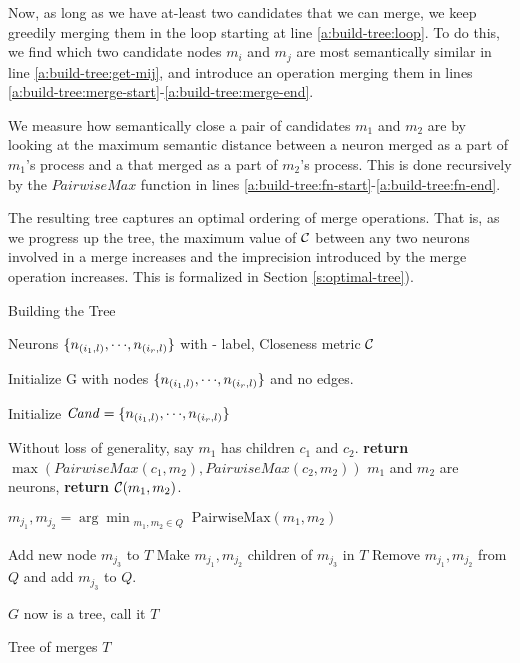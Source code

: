 Now, as long as we have at-least two candidates that we can merge, we keep
greedily merging them in the loop starting at line \ref{a:build-tree:loop}. To
do this, we find which two candidate nodes $m_i$ and $m_j$ are most semantically
similar in line \ref{a:build-tree:get-mij}, and introduce an operation merging
them in lines \ref{a:build-tree:merge-start}-\ref{a:build-tree:merge-end}.

We measure how semantically close a pair of candidates $m_1$ and $m_2$ are by
looking at the maximum semantic distance between a neuron merged as a part of
$m_1$'s process and a that merged as a part of $m_2$'s process. This is done
recursively by the $\mathit{PairwiseMax}$ function in lines
\ref{a:build-tree:fn-start}-\ref{a:build-tree:fn-end}.

The resulting tree captures an optimal ordering of merge operations. 
That is, as we progress up the tree, the maximum value of $\mathcal{C}$ between any two
neurons involved in a merge increases and the imprecision
introduced by the merge operation increases. 
This is formalized in Section \ref{s:optimal-tree}). 


\begin{algorithm}
\caption{Building the Tree}
\label{a:build-tree}
\begin{algorithmic}[1]

    \Require Neurons $\{n_{(i_1,l)}, {\cdots}, n_{(i_r,l)}\}$ with \inc-\dec
    label, Closeness metric $\mathcal{C}$

    
    \State Initialize G with nodes $\{ n_{(i_1,l)}, {\cdots}, n_{(i_r,l)} \}$
    and no edges. \label{a:build-tree:init}

    \State Initialize $\mathit{Cand}=\{ n_{(i_1,l)}, {\cdots}, n_{(i_r,l)} \}$
    \label{a:build-tree:init-cand}

     \label{a:build-tree:fn-start}
        
            \State Without loss of generality, say $m_1$ has children $c_1$ and
            $c_2$. 
            \State \textbf{return} $\max( PairwiseMax( c_1, m_2 ), PairwiseMax(
            c_2, m_2 ) )$
        \Else
            \State $m_1$ and $m_2$ are neurons, \textbf{return} $\mathcal{C}( m_1, m_2 )$.
        \EndIf

    \EndFunction \label{a:build-tree:fn-end}

     \label{a:build-tree:loop}
    
        \State $m_{j_1}, m_{j_2} = \arg\min_{\substack{m_1, m_2 \in Q}} 
            \text{PairwiseMax}(m_1, m_2)$ \label{a:build-tree:get-mij}

        \State Add new node $m_{j_3}$ to $T$ \label{a:build-tree:merge-start}
        \State Make $m_{j_1}, m_{j_2}$ children of $m_{j_3}$ in $T$
        \State Remove $m_{j_1}, m_{j_2}$ from $Q$ and add $m_{j_3}$ to $Q$.
            \label{a:build-tree:merge-end}
    \EndWhile

    \State $G$ now is a tree, call it $T$

    \Ensure Tree of merges $T$
\end{algorithmic}
\end{algorithm}


